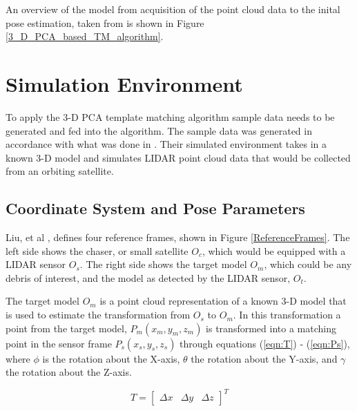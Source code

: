 \documentclass[conference]{IEEEtran}
\begin{document}
		An overview of the model from acquisition of the point cloud data to the inital pose estimation, taken from \cite{2017_pose_pca} is shown in Figure \ref{3_D_PCA_based_TM_algorithm}.


	\section{Simulation Environment}
		To apply the 3-D PCA template matching algorithm sample data needs to be generated and fed into the algorithm. The sample data was generated in accordance with what was done in \cite{liu2016point}. Their simulated environment takes in a known 3-D model and simulates LIDAR point cloud data that would be collected from an orbiting satellite.


	\subsection{Coordinate System and Pose Parameters}
		Liu, et al \cite{liu2016point}, defines four reference frames, shown in Figure \ref{ReferenceFrames}. The left side shows the chaser, or small satellite $O_c$, which would be equipped with a LIDAR sensor $O_s$. The right side shows the target model $O_m$, which could be any debris of interest, and the model as detected by the LIDAR sensor, $O_t$.
		
		The target model $O_m$ is a point cloud representation of a known 3-D model that is used to estimate the transformation from $O_s$ to $O_m$. In this transformation a point from the target model, $P_m (x_m,y_m,z_m)$ is transformed into a matching point in the sensor frame $P_s (x_s,y_s,z_s)$ through equations (\ref{eqn:T}) - (\ref{eqn:Ps}), where $\phi$ is the rotation about the X-axis, $\theta$ the rotation about the Y-axis, and $\gamma$ the rotation about the Z-axis. 
		
		\begin{equation}
			\label{eqn:T}
			T = \begin{bmatrix} \Delta x  & \Delta y & \Delta z \end{bmatrix}^T
		\end{equation}
\end{document}
